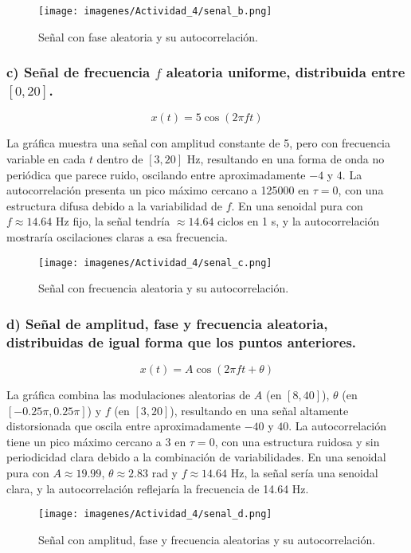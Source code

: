 \begin{figure}[H]
\centering
\texttt{[image: imagenes/Actividad\_4/senal\_b.png]}
\caption{Señal con fase aleatoria y su autocorrelación.}
\label{fig:b}
\end{figure}

\subsubsection*{c) Señal de frecuencia \(f\) aleatoria uniforme, distribuida entre \([0, 20]\).}

\[
x(t) = 5 \cos(2 \pi f t)
\]

La gráfica muestra una señal con amplitud constante de 5, pero con frecuencia variable en cada $t$ dentro de $[3, 20]$ Hz, resultando en una forma de onda no periódica que parece ruido, oscilando entre aproximadamente $-4$ y $4$. La autocorrelación presenta un pico máximo cercano a 125000 en $\tau=0$, con una estructura difusa debido a la variabilidad de $f$. En una senoidal pura con $f \approx 14.64$ Hz fijo, la señal tendría $\approx 14.64$ ciclos en 1 s, y la autocorrelación mostraría oscilaciones claras a esa frecuencia.

\begin{figure}[H]
\centering
\texttt{[image: imagenes/Actividad\_4/senal\_c.png]}
\caption{Señal con frecuencia aleatoria y su autocorrelación.}
\label{fig:c}
\end{figure}

\subsubsection*{d) Señal de amplitud, fase y frecuencia aleatoria, distribuidas de igual forma que los puntos anteriores.}

\[
x(t) = A \cos(2 \pi f t + \theta)
\]

La gráfica combina las modulaciones aleatorias de $A$ (en $[8, 40]$), $\theta$ (en $[-0.25\pi, 0.25\pi]$) y $f$ (en $[3, 20]$), resultando en una señal altamente distorsionada que oscila entre aproximadamente $-40$ y $40$. La autocorrelación tiene un pico máximo cercano a 3 en $\tau=0$, con una estructura ruidosa y sin periodicidad clara debido a la combinación de variabilidades. En una senoidal pura con $A \approx 19.99$, $\theta \approx 2.83$ rad y $f \approx 14.64$ Hz, la señal sería una senoidal clara, y la autocorrelación reflejaría la frecuencia de 14.64 Hz.

\begin{figure}[H]
\centering
\texttt{[image: imagenes/Actividad\_4/senal\_d.png]}
\caption{Señal con amplitud, fase y frecuencia aleatorias y su autocorrelación.}
\label{fig:d}
\end{figure}

